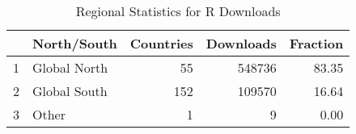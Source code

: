 \begin{table}[ht]
\centering
\begin{tabular}{rlrrr}
  \hline
 & North/South & Countries & Downloads & Fraction \\ 
  \hline
1 & Global North &  55 & 548736 & 83.35 \\ 
  2 & Global South & 152 & 109570 & 16.64 \\ 
  3 & Other &   1 &   9 & 0.00 \\ 
   \hline
\end{tabular}
\caption{Regional Statistics for R Downloads} 
\label{tab:r_downloads_global_stats_select}
\end{table}
